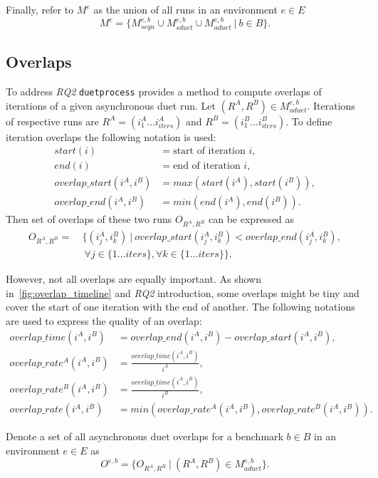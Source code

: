 Finally, refer to $M^e$ as the union of all runs in an environment $e \in E$
$$
M^e = \{ M^{e, b}_{seqn} \cup M^{e, b}_{sduet} \cup M^{e, b}_{aduet} ~|~ b \in B \}.
$$


\subsection{Overlaps}
\label{sec:overlaps}

To address \emph{RQ2} \lstinline{duetprocess} provides a method to compute overlaps of iterations of a given asynchronous duet run.
Let $(R^A, R^B) \in M^{e, b}_{aduet}$.
Iterations of respective runs are $R^A = (i^A_1 \dots i^A_{iters})$ and $R^B = (i^B_1 \dots i^B_{iters})$.
To define iteration overlaps the following notation is used:
\begin{align*}
start(i) &= \text{start of iteration } i,\\
end(i) &= \text{end of iteration } i,\\
overlap\_start(i^A, i^B) &= max(start(i^A), start(i^B)),\\
overlap\_end(i^A, i^B) &= min(end(i^A), end(i^B)).
\end{align*} 
Then set of overlaps of these two runs $O_{R^A, R^B}$ can be expressed as
\begin{align*}
O_{R^A, R^B} =&~\{(i^A_j, i^B_k)~|~overlap\_start(i^A_j, i^B_k) < overlap\_end(i^A_j, i^B_k),\\
              &~~\forall j \in \{1 \dots iters\}, \forall k \in \{1 \dots iters\}\}.
\end{align*} 

However, not all overlaps are equally important.
As shown in~\cref{fig:overlap_timeline} and \emph{RQ2} introduction, some overlaps might be tiny and cover the start of one iteration with the end of another.
The following notations are used to express the quality of an overlap:
\begin{align*}
overlap\_time(i^A, i^B) &= overlap\_end(i^A, i^B) - overlap\_start(i^A, i^B), \\
overlap\_rate^A(i^A, i^B) &= \frac{overlap\_time(i^A, i^B)}{i^A}, \\
overlap\_rate^B(i^A, i^B) &= \frac{overlap\_time(i^A, i^B)}{i^B}, \\
overlap\_rate(i^A, i^B) &= min(overlap\_rate^A(i^A, i^B), overlap\_rate^B(i^A, i^B)).
\end{align*}

Denote a set of all asynchronous duet overlaps for a benchmark $b \in B$ in an environment $e \in E$ as
\begin{equation}\label{eq:overlap_set}
O^{e,b} = \{O_{R^A, R^B}~|~(R^A, R^B) \in M^{e,b}_{aduet}\}.
\end{equation}
